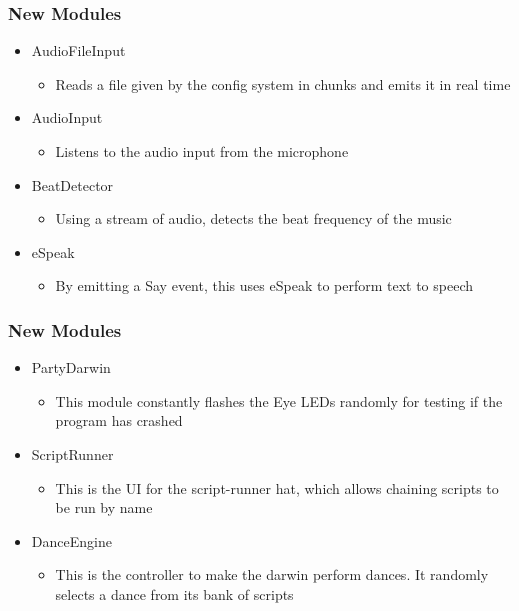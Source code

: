 \documentclass{beamer}
\begin{document}
\begin{frame}
	\frametitle{New Modules}
	\begin{itemize}
		\item AudioFileInput
			\begin{itemize}
				\item Reads a file given by the config system in chunks and emits it in real time
			\end{itemize}
			
		\item AudioInput
			\begin{itemize}
				\item Listens to the audio input from the microphone
			\end{itemize}
			
		\item BeatDetector
			\begin{itemize}
				\item Using a stream of audio, detects the beat frequency of the music
			\end{itemize}
			
		\item eSpeak
			\begin{itemize}
				\item By emitting a Say event, this uses eSpeak to perform text to speech
			\end{itemize}
	\end{itemize}
\end{frame}
			
\begin{frame}
	\frametitle{New Modules}
	\begin{itemize}
		\item PartyDarwin
			\begin{itemize}
				\item This module constantly flashes the Eye LEDs randomly for testing if the program has crashed
			\end{itemize}

		\item ScriptRunner
			\begin{itemize}
				\item This is the UI for the script-runner hat, which allows chaining scripts to be run by name
			\end{itemize}
			
		\item DanceEngine
			\begin{itemize}
				\item This is the controller to make the darwin perform dances. It randomly selects a dance from its bank of scripts
			\end{itemize}
	\end{itemize}
\end{frame}
\end{document}

